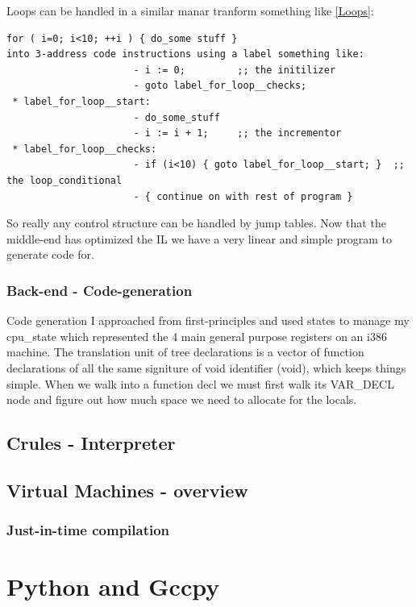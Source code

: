 \documentclass[defaultstyle,11pt]{article}
\begin{document}
Loops can be handled in a similar manar tranform something like \ref{Loops}:

\begin{lstlisting}
for ( i=0; i<10; ++i ) { do_some stuff }
into 3-address code instructions using a label something like:
                      - i := 0;         ;; the initilizer
                      - goto label_for_loop__checks;
 * label_for_loop__start:
                      - do_some_stuff
                      - i := i + 1;     ;; the incrementor
 * label_for_loop__checks:
                      - if (i<10) { goto label_for_loop__start; }  ;; the loop_conditional
                      - { continue on with rest of program }
\end{lstlisting}

So really any control structure can be handled by jump tables. Now that the middle-end has
optimized the IL we have a very linear and simple program to generate code for.

\subsubsection{Back-end - Code-generation}

Code generation I approached from first-principles and used states to manage
my cpu\_state which represented the 4 main general purpose registers on an i386 machine.
The translation unit of tree declarations is a vector of function declarations of all the
same signiture of void identifier (void), which keeps things simple. When we walk into a
function decl we must first walk its VAR\_DECL node and figure out how much space we need to
allocate for the locals.

\subsection{Crules - Interpreter}

\subsection{Virtual Machines - overview}

\subsubsection{Just-in-time compilation}

\section{Python and Gccpy}
\end{document}
